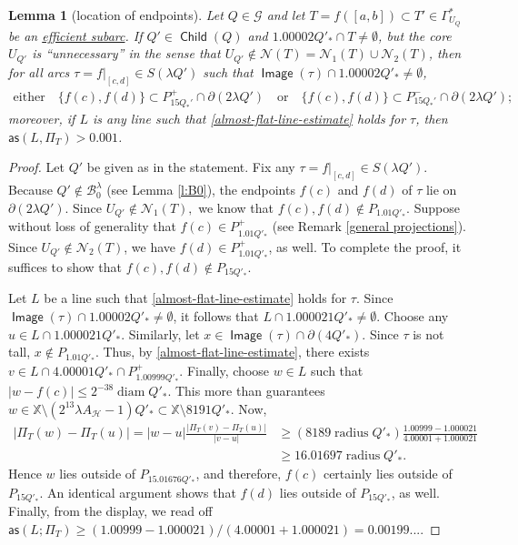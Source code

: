 \documentclass[12pt]{amsart}
\numberwithin{equation}{section}
\theoremstyle{plain}
\newtheorem{lemma}[theorem]{Lemma}
\theoremstyle{definition}
\def\XX{{\mathbb{X}}}
\newcommand{\radius}{\mathop\mathrm{radius}\nolimits}
\newcommand{\diam}{\mathop\mathrm{diam}\nolimits}
\newcommand{\Image}{\mathop\mathsf{Image}\nolimits}
\newcommand{\Child}{\mathop\mathsf{Child}\nolimits}
\numberwithin{figure}{section}
\begin{document}
\begin{lemma}[location of endpoints]\label{unnecessary-endpoints}
Let $Q \in \mathscr{G}$ and let $T=f([a,b]) \subset T' \in \Gamma^*_{U_Q}$ be an \hyperref[def:subarc]{efficient subarc}. If $Q'\in \Child(Q)$ and $1.00002Q'_*\cap T\not = \emptyset$, but the core $U_{Q'}$ is ``unnecessary'' in the sense that $U_{Q'} \not \in \mathcal{N}(T)=\mathcal{N}_1(T)\cup\mathcal{N}_2(T)$, then for all arcs $\tau=f|_{[c,d]}\in S(\lambda Q')$ such that $\Image(\tau)\cap 1.00002 Q'_*\neq \emptyset$,
\begin{align*}
\text{either}\quad\{f(c), f(d)\} \subset P_{15Q_*'}^+ \cap \partial(2\lambda Q')\quad\text{or}\quad\{f(c), f(d)\} \subset P_{15Q_*'}^- \cap \partial (2\lambda Q');
\end{align*} moreover, if $L$ is any line such that \eqref{almost-flat-line-estimate} holds for $\tau$, then $\mathsf{as}(L,\Pi_T)>0.001$.
\end{lemma}

\begin{proof} Let $Q'$ be given as in the statement. Fix any $\tau=f|_{[c,d]}\in S(\lambda Q')$. Because $Q'\not\in \mathscr{B}^\lambda_0$ (see Lemma \ref{l:B0}), the endpoints $f(c)$ and $f(d)$ of $\tau$ lie on $\partial(2\lambda Q')$. Since $U_{Q'} \not \in \mathcal{N}_1(T),$ we know that $f(c),f(d)\not\in P_{1.01Q'_*}$. Suppose without loss of generality that $f(c)\in P_{1.01Q'_*}^+$ (see Remark \ref{general projections}). Since $U_{Q'}\not\in\mathcal{N}_2(T)$, we have $f(d)\in P_{1.01Q'_*}^+$, as well. To complete the proof, it suffices to show that $f(c), f(d) \not \in P_{15Q'_*}$.

Let $L$ be a line such that \eqref{almost-flat-line-estimate} holds for $\tau$. Since $\Image(\tau)\cap 1.00002Q'_*\neq\emptyset$, it follows that $L\cap 1.000021Q'_* \neq \emptyset$. Choose any $u\in L\cap 1.000021Q'_*$. Similarly, let $x\in \Image(\tau)\cap \partial(4Q'_*)$. Since $\tau$ is not tall, $x\not\in P_{1.01Q'_*}$. Thus, by \eqref{almost-flat-line-estimate}, there exists $v\in L\cap 4.00001Q'_*\cap P_{1.00999Q'_*}^+$. Finally, choose $w\in L$ such that $|w-f(c)|\leq 2^{-38}\diam Q'_*$. This more than guarantees $w\in \XX\setminus (2^{13}\lambda A_\mathscr{H} - 1)Q'_*\subset \XX\setminus 8191Q'_*$. Now, \begin{align*} |\Pi_T(w)-\Pi_T(u)|= |w-u|\frac{|\Pi_T(v)-\Pi_T(u)|}{|v-u|}&\geq (8189\radius Q'_*)\frac{1.00999-1.000021}{4.00001+1.000021}\\ &\geq 16.01697\radius Q'_*.\end{align*} Hence $w$ lies outside of $P_{15.01676Q'_*}$, and therefore, $f(c)$ certainly lies outside of $P_{15Q'_*}$. An identical argument shows that $f(d)$ lies outside of $P_{15Q'_*}$, as well. Finally, from the display, we read off $\mathsf{as}(L;\Pi_T)\geq (1.00999-1.000021)/(4.00001+1.000021)=0.00199...$.
\end{proof}
\end{document}
